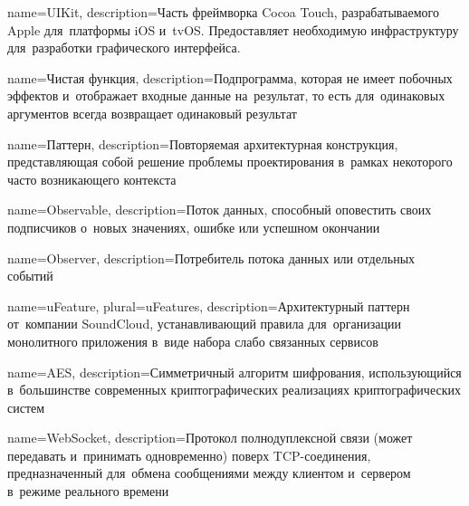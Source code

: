 




{
  name={UIKit},
  description={Часть фреймворка Cocoa Touch, разрабатываемого Apple для~платформы iOS и~tvOS. Предоставляет необходимую инфраструктуру для~разработки графического интерфейса.}
}

{
  name={Чистая функция},
  description={Подпрограмма, которая не имеет побочных эффектов и~отображает входные данные на~результат, то есть для~одинаковых аргументов всегда возвращает одинаковый результат}
}

{
  name={Паттерн},
  description={Повторяемая архитектурная конструкция, представляющая собой решение проблемы проектирования в~рамках некоторого часто возникающего контекста}
}

{
  name=Observable,
  description={Поток данных, способный оповестить своих подписчиков о~новых значениях, ошибке или успешном окончании}
}

{
  name=Observer,
  description={Потребитель потока данных или отдельных событий}
}

{
  name=uFeature,
  plural={uFeatures},
  description={Архитектурный паттерн от~компании SoundCloud, устанавливающий правила для~организации монолитного приложения в~виде набора слабо связанных сервисов}
}

{
  name=AES,
  description={Симметричный алгоритм шифрования, использующийся в~большинстве современных криптографических реализациях криптографических систем}
}

{
  name=WebSocket,
  description={Протокол полнодуплексной связи (может передавать и~принимать одновременно) поверх TCP-соединения, предназначенный для~обмена сообщениями между клиентом и~сервером в~режиме реального времени}
}


\glsaddall


